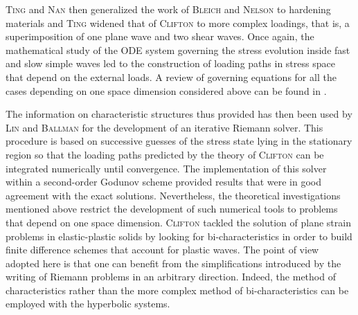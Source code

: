 \textsc{Ting} and \textsc{Nan} \cite{Ting68} then generalized the work of \textsc{Bleich} and \textsc{Nelson} to hardening materials and \textsc{Ting} \cite{Ting69} widened that of \textsc{Clifton} to more complex loadings, that is, a superimposition of one plane wave and two shear waves.
Once again, the mathematical study of the ODE system governing the stress evolution inside fast and slow simple waves led to the construction of loading paths in stress space that depend on the external loads. A review of governing equations for all the cases depending on one space dimension considered above can be found in \cite{Nowacki}.

The information on characteristic structures thus provided has then been used by \textsc{Lin} and \textsc{Ballman} \cite{Lin_et_Ballman} for the development of an iterative Riemann solver.
This procedure is based on successive guesses of the stress state lying in the stationary region so that the loading paths predicted by the theory of \textsc{Clifton} \cite{Clifton} can be integrated numerically until convergence.
The implementation of this solver within a second-order Godunov scheme provided results that were in good agreement with the exact solutions.
Nevertheless, the theoretical investigations mentioned above restrict the development of such numerical tools to problems that depend on one space dimension.
\textsc{Clifton} tackled the solution of plane strain problems in elastic-plastic solids by looking for bi-characteristics \cite{Clifton_thesis} in order to build finite difference schemes that account for plastic waves.
The point of view adopted here is that one can benefit from the simplifications introduced by the writing of Riemann problems in an arbitrary direction.
Indeed, the method of characteristics rather than the more complex method of bi-characteristics can be employed with the hyperbolic systems.

